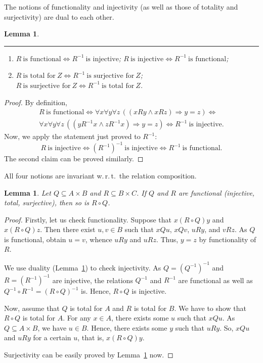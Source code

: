 \documentclass[12pt,notitlepage]{article}
\theoremstyle{plain}
\newtheorem{lemma}[thm]{Lemma}
\theoremstyle{definition}
\theoremstyle{plain}
\newcommand{\sbs}{\subseteq}
\newcommand{\1}{\mathbf{1}}
\newcommand{\0}{\mathbf{0}}
\newcommand{\ply}{\Longrightarrow}
\begin{document}
The notions of functionality and injectivity (as well as those of totality and surjectivity) are dual to each other.
\begin{lemma}\label{ch0:fnc_inv}\rule{1pt}{0pt}
\begin{enumerate}
\item $R\ \mbox{is functional} \iff R^{-1}\ \mbox{is injective}$; $R\ \mbox{is injective} \iff R^{-1}\ \mbox{is functional}$;
\item $R\ \mbox{is total for}\ Z \iff R^{-1}\ \mbox{is surjective for}\ Z$; $R\ \mbox{is surjective for}\ Z \iff R^{-1}\ \mbox{is total for}\ Z$.
\end{enumerate}
\end{lemma}
\begin{proof}
By definition,
\begin{multline*}
R\ \mbox{is functional} \iff \forall x \forall y \forall z\, ( (x R y \wedge x R z) \ply y = z ) \iff\\
 \forall x \forall y \forall z\, ( (y R^{-1} x \wedge z R^{-1} x) \ply y = z )  \iff R^{-1}\ \mbox{is injective}.
\end{multline*}
Now, we apply the statement just proved to $R^{-1}$:
$$
R\ \mbox{is injective} \iff (R^{-1})^{-1}\ \mbox{is injective} \iff R^{-1}\ \mbox{is functional}.
$$
The second claim can be proved similarly.
\end{proof}


\noindent All four notions are invariant w.\,r.\,t.\ the relation composition.
\begin{lemma}\label{ch0:fnc_cmp} Let $Q \sbs A \times B$ and $R \sbs B \times C$.  If $Q$ and $R$ are functional (injective, total, surjective), then so is $R \circ Q$.
\end{lemma}
\begin{proof}
Firstly, let us check functionality. Suppose that $x(R \circ Q)y$ and $x(R \circ Q)z$. Then there exist $u,v\in B$ such that $xQu$, $xQv$, $u R y$, and $v R z$. As $Q$ is functional, obtain $u = v$, whence $u R y$ and $u R z$. Thus, $y = z$ by functionality of $R$.

We use duality (Lemma~\ref{ch0:fnc_inv}) to check injectivity. As $Q = (Q^{-1})^{-1}$ and $R = (R^{-1})^{-1}$ are injective, the relations $Q^{-1}$ and $R^{-1}$ are functional as well as $Q^{-1} \circ R^{-1} = (R \circ Q)^{-1}$ is. Hence, $R \circ Q$ is injective.

Now, assume that $Q$ is total for $A$ and $R$ is total for $B$. We have to show that $R \circ Q$ is total for $A$. For any $x \in A$, there exists some $u$ such that $x Q u$. As $Q \sbs A \times B$, we have $u \in B$. Hence, there exists some $y$ such that $u R y$. So, $x Q u$ and $u R y$ for a certain $u$, that is, $x(R \circ Q)y$.

Surjectivity can be easily proved by Lemma~\ref{ch0:fnc_inv} now.
\end{proof}
\end{document}
